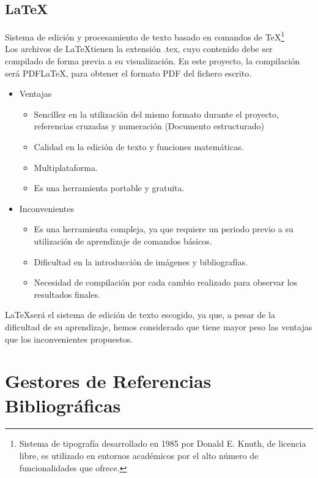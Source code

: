 \subsection{\LaTeX}
Sistema de edición y procesamiento de texto basado en comandos de TeX\footnote{Sistema de tipografía desarrollado en 1985 por Donald E. Knuth, de licencia libre, es utilizado en entornos académicos por el alto número de funcionalidades que ofrece\cite{wiki:Tex}.}\\
Los archivos de \LaTeX tienen la extensión .tex, cuyo contenido debe ser compilado de forma previa a su visualización. En este proyecto, la compilación será PDFLaTeX, para obtener el formato PDF del fichero escrito. 
\begin{itemize}
\item Ventajas
\begin{itemize}
\item Sencillez en la utilización del mismo formato durante el proyecto, referencias cruzadas y numeración (Documento estructurado)
\item Calidad en la edición de texto y funciones matemáticas. 
\item Multiplataforma.
\item Es una herramienta portable y gratuita.
\end{itemize}
\end{itemize}
\begin{itemize}
\item Inconvenientes
\begin{itemize}
\item Es una herramienta compleja, ya que requiere un periodo previo a su utilización de aprendizaje de comandos básicos. 
\item Dificultad en la introducción de imágenes  y bibliografías.
\item Necesidad de compilación por cada cambio realizado para observar los resultados finales. \nocite{aq:LaTex} 
\end{itemize}
\end{itemize}
\LaTeX  será el sistema de edición de texto escogido, ya que, a pesar de la dificultad de su aprendizaje, hemos considerado que tiene mayor peso las ventajas que los inconvenientes propuestos.

\section{Gestores de Referencias Bibliográficas}
